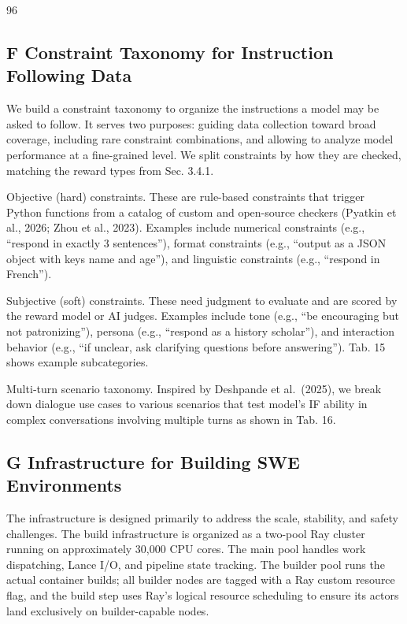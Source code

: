\documentclass[
  10
]{article}
\begin{document}
96

\subsection{F Constraint Taxonomy for Instruction Following
Data}\label{f-constraint-taxonomy-for-instruction-following-data}

We build a constraint taxonomy to organize the instructions a model may
be asked to follow. It serves two purposes: guiding data collection
toward broad coverage, including rare constraint combinations, and
allowing to analyze model performance at a fine-grained level. We split
constraints by how they are checked, matching the reward types from Sec.
3.4.1.

Objective (hard) constraints. These are rule-based constraints that
trigger Python functions from a catalog of custom and open-source
checkers (Pyatkin et al., 2026; Zhou et al., 2023). Examples include
numerical constraints (e.g., ``respond in exactly 3 sentences''), format
constraints (e.g., ``output as a JSON object with keys name and age''),
and linguistic constraints (e.g., ``respond in French'').

Subjective (soft) constraints. These need judgment to evaluate and are
scored by the reward model or AI judges. Examples include tone (e.g.,
``be encouraging but not patronizing''), persona (e.g., ``respond as a
history scholar''), and interaction behavior (e.g., ``if unclear, ask
clarifying questions before answering''). Tab. 15 shows example
subcategories.

Multi‐turn scenario taxonomy. Inspired by Deshpande et al.~(2025), we
break down dialogue use cases to various scenarios that test model's IF
ability in complex conversations involving multiple turns as shown in
Tab. 16.

\subsection{G Infrastructure for Building SWE
Environments}\label{g-infrastructure-for-building-swe-environments}

The infrastructure is designed primarily to address the scale,
stability, and safety challenges. The build infrastructure is organized
as a two-pool Ray cluster running on approximately 30,000 CPU cores. The
main pool handles work dispatching, Lance I/O, and pipeline state
tracking. The builder pool runs the actual container builds; all builder
nodes are tagged with a Ray custom resource flag, and the build step
uses Ray's logical resource scheduling to ensure its actors land
exclusively on builder-capable nodes.
\end{document}
